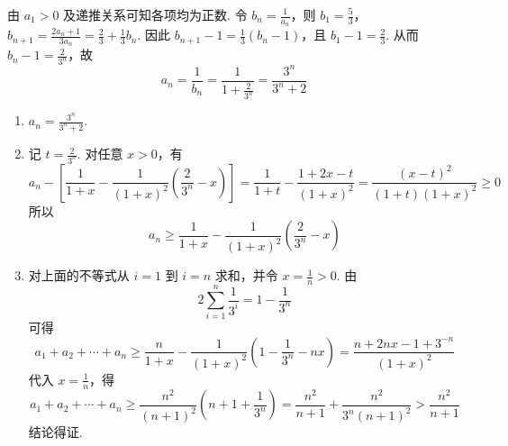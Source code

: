 \begin{solution}
由 \(a_{1}>0\) 及递推关系可知各项均为正数. 令 \(b_{n}=\frac{1}{a_{n}}\)，则 \(b_{1}=\frac{5}{3}\)，\(b_{n+1}=\frac{2a_{n}+1}{3a_{n}}=\frac{2}{3}+\frac{1}{3}b_{n}\).
因此 \(b_{n+1}-1=\frac{1}{3}(b_{n}-1)\)，且 \(b_{1}-1=\frac{2}{3}\).
从而 \(b_{n}-1=\frac{2}{3^{n}}\)，故
\[
a_{n}=\frac{1}{b_{n}}=\frac{1}{1+\frac{2}{3^{n}}}=\frac{3^{n}}{3^{n}+2}
\]

\begin{enumerate}
\item \(\displaystyle a_{n}=\frac{3^{n}}{3^{n}+2}\).

\item 记 \(t=\frac{2}{3^{n}}\). 对任意 \(x>0\)，有
\[
a_{n}-\left[\frac{1}{1+x}-\frac{1}{(1+x)^{2}}\left(\frac{2}{3^{n}}-x\right)\right]
=\frac{1}{1+t}-\frac{1+2x-t}{(1+x)^{2}}=\frac{(x-t)^{2}}{(1+t)(1+x)^{2}}\geqslant0
\]
所以
\[
a_{n}\geqslant\frac{1}{1+x}-\frac{1}{(1+x)^{2}}\left(\frac{2}{3^{n}}-x\right)
\]

\item 对上面的不等式从 \(i=1\) 到 \(i=n\) 求和，并令 \(x=\frac{1}{n}>0\). 由
\[
2\sum_{i=1}^{n}\frac{1}{3^{i}}=1-\frac{1}{3^{n}}
\]
可得
\[
a_{1}+a_{2}+\cdots+a_{n}\geqslant\frac{n}{1+x}-\frac{1}{(1+x)^{2}}\left(1-\frac{1}{3^{n}}-nx\right)=\frac{n+2nx-1+3^{-n}}{(1+x)^{2}}
\]
代入 \(x=\frac{1}{n}\)，得
\[
 a_{1}+a_{2}+\cdots+a_{n}\geqslant\frac{n^{2}}{(n+1)^{2}}\left(n+1+\frac{1}{3^{n}}\right)=\frac{n^{2}}{n+1}+\frac{n^{2}}{3^{n}(n+1)^{2}}>\frac{n^{2}}{n+1}
\]
结论得证.
\end{enumerate}
\end{solution}
